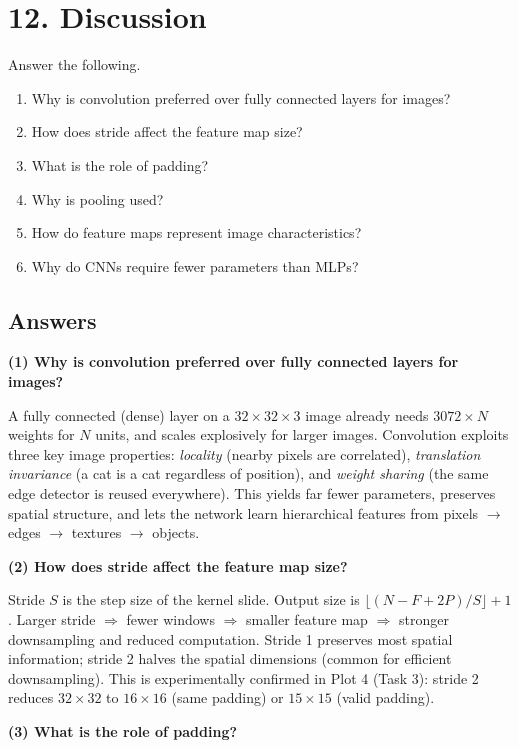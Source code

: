 \documentclass[11pt]{article}
\begin{document}
\section*{12. Discussion}

Answer the following.

\begin{enumerate}
\item Why is convolution preferred over fully connected layers for images?
\item How does stride affect the feature map size?
\item What is the role of padding?
\item Why is pooling used?
\item How do feature maps represent image characteristics?
\item Why do CNNs require fewer parameters than MLPs?
\end{enumerate}

\subsection*{Answers}

\textbf{(1) Why is convolution preferred over fully connected layers for images?}

A fully connected (dense) layer on a $32\times32\times3$ image already needs $3072\times N$ weights for $N$ units, and scales explosively for larger images. Convolution exploits three key image properties: \emph{locality} (nearby pixels are correlated), \emph{translation invariance} (a cat is a cat regardless of position), and \emph{weight sharing} (the same edge detector is reused everywhere). This yields far fewer parameters, preserves spatial structure, and lets the network learn hierarchical features from pixels $\to$ edges $\to$ textures $\to$ objects.

\textbf{(2) How does stride affect the feature map size?}

Stride $S$ is the step size of the kernel slide. Output size is $\lfloor (N-F+2P)/S \rfloor + 1$. Larger stride $\Rightarrow$ fewer windows $\Rightarrow$ smaller feature map $\Rightarrow$ stronger downsampling and reduced computation. Stride 1 preserves most spatial information; stride 2 halves the spatial dimensions (common for efficient downsampling). This is experimentally confirmed in Plot 4 (Task 3): stride 2 reduces $32\times32$ to $16\times16$ (same padding) or $15\times15$ (valid padding).

\textbf{(3) What is the role of padding?}
\end{document}
